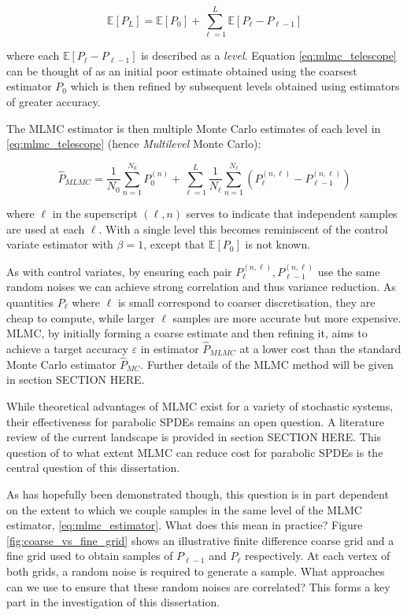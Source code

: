 \begin{equation}\label{eq:mlmc_telescope}
    \mathbb{E}[P_L] = \mathbb{E}[P_0] + \sum_{\ell =1}^L \mathbb{E}[P_\ell - P_{\ell -1}]
\end{equation}

where each $\mathbb{E}[P_\ell - P_{\ell - 1}]$ is described as a \textit{level}. 
Equation \eqref{eq:mlmc_telescope} can be thought of as an initial poor 
estimate obtained using the coarsest estimator $P_0$ which is then refined 
by subsequent levels obtained using estimators of greater accuracy.

The MLMC estimator is then multiple Monte Carlo estimates of each
level in \eqref{eq:mlmc_telescope} (hence \textit{Multilevel} Monte Carlo):

\begin{equation}\label{eq:mlmc_estimator}
    \hat{P}_{MLMC} = \frac{1}{N_0} \sum_{n=1}^{N_0} P_0^{(n)} + 
    \sum_{\ell=1}^L \frac{1}{N_\ell} \sum_{n=1}^{N_\ell} \left(P_\ell^{(n,\ell)} - P_{\ell - 1}^{(n,\ell)}\right)
\end{equation}

where $\ell$ in the superscript $(\ell, n)$ serves to indicate that independent samples 
are used at each $\ell$. With a single level this becomes reminiscent of the 
control variate estimator with $\beta = 1$, 
except that $\mathbb{E}[P_0]$ is not known. 

As with control variates, by ensuring each pair 
$P_\ell^{(n,\ell)}, P_{\ell - 1}^{(n,\ell)}$ use the 
same random noises we can achieve strong correlation and thus 
variance reduction. As quantities $P_\ell$ where $\ell$ is small correspond 
to coarser discretisation, they are cheap to compute, while larger 
$\ell$ samples are more accurate but more expensive. MLMC, 
by initially forming a coarse estimate and then refining it, aims to 
achieve a target accuracy $\varepsilon$ in estimator $\hat{P}_{MLMC}$ 
at a lower cost than the standard Monte Carlo estimator $\hat{P}_{MC}$. 
Further details of the MLMC method will be given in section SECTION HERE.

While theoretical advantages of MLMC exist for a variety of stochastic 
systems, their effectiveness for parabolic SPDEs remains an open question. A 
literature review of the current landscape is provided in section
SECTION HERE. This question of to what extent MLMC can reduce cost
for parabolic SPDEs is the central question of this dissertation.

As has hopefully been demonstrated though, this question is in part dependent 
on the extent to which we couple samples in the same level of the MLMC
estimator, \eqref{eq:mlmc_estimator}. What does this mean in practice? 
Figure \ref{fig:coarse_vs_fine_grid} shows an illustrative finite difference 
coarse grid and a fine grid
used to obtain samples of $P_{\ell - 1}$ and $P_\ell$ respectively.
At each vertex of both grids, a random noise is required to generate a sample.
What approaches can we use to ensure that these random noises are correlated?
This forms a key part in the investigation of this dissertation.

